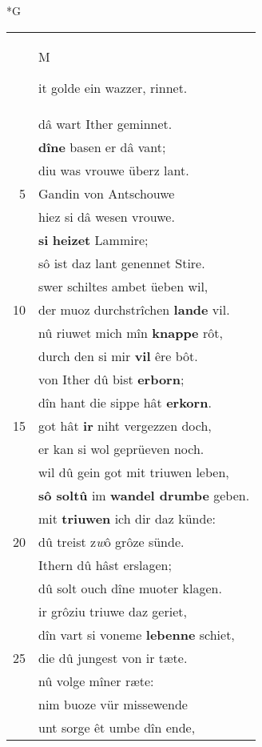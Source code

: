 \documentclass[8pt,a4paper,notitlepage]{article}
\begin{document}
\newpage
\begin{table}[ht]
\begin{minipage}[t]{0.5\linewidth}
\small
\begin{center}*G
\end{center}
\begin{tabular}{rl}
 & \begin{large}M\end{large}it golde ein wazzer, rinnet.\\ 
 & dâ wart Ither geminnet.\\ 
 & \textbf{dîne} basen er dâ vant;\\ 
 & diu was vrouwe überz lant.\\ 
5 & Gandin von Antschouwe\\ 
 & hiez si dâ wesen vrouwe.\\ 
 & \textbf{si} \textbf{heizet} Lammire;\\ 
 & sô ist daz lant genennet Stire.\\ 
 & swer schiltes ambet üeben wil,\\ 
10 & der muoz durchstrîchen \textbf{lande} vil.\\ 
 & nû riuwet mich mîn \textbf{knappe} rôt,\\ 
 & durch den si mir \textbf{vil} êre bôt.\\ 
 & von Ither dû bist \textbf{erborn};\\ 
 & dîn hant die sippe hât \textbf{erkorn}.\\ 
15 & got hât \textbf{ir} niht vergezzen doch,\\ 
 & er kan si wol geprüeven noch.\\ 
 & wil dû gein got mit triuwen leben,\\ 
 & \textbf{sô soltû} im \textbf{wandel drumbe} geben.\\ 
 & mit \textbf{triuwen} ich dir daz künde:\\ 
20 & dû treist z\textit{w}ô grôze sünde.\\ 
 & Ithern dû hâst erslagen;\\ 
 & dû solt ouch dîne muoter klagen.\\ 
 & ir grôziu triuwe daz geriet,\\ 
 & dîn vart si voneme \textbf{lebenne} schiet,\\ 
25 & die dû jungest von ir tæte.\\ 
 & nû volge mîner ræte:\\ 
 & nim buoze vür missewende\\ 
 & unt sorge êt umbe dîn ende,\\ 

\end{tabular}
\end{minipage}
\end{table}
\end{document}
